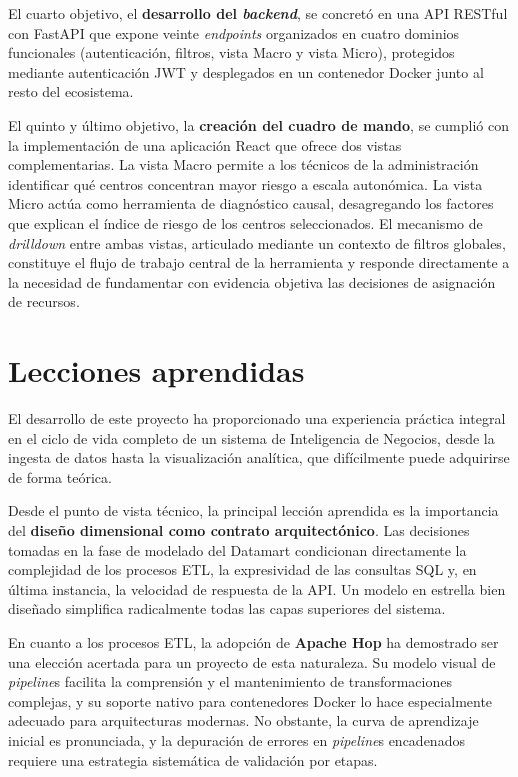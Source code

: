 El cuarto objetivo, el \textbf{desarrollo del \textit{backend}}, se concretó en una API RESTful con FastAPI que expone veinte \textit{endpoints} organizados en cuatro dominios funcionales (autenticación, filtros, vista Macro y vista Micro), protegidos mediante autenticación JWT y desplegados en un contenedor Docker junto al resto del ecosistema.

El quinto y último objetivo, la \textbf{creación del cuadro de mando}, se cumplió con la implementación de una aplicación React que ofrece dos vistas complementarias. La vista Macro permite a los técnicos de la administración identificar qué centros concentran mayor riesgo a escala autonómica. La vista Micro actúa como herramienta de diagnóstico causal, desagregando los factores que explican el índice de riesgo de los centros seleccionados. El mecanismo de \textit{drilldown} entre ambas vistas, articulado mediante un contexto de filtros globales, constituye el flujo de trabajo central de la herramienta y responde directamente a la necesidad de fundamentar con evidencia objetiva las decisiones de asignación de recursos.

\section{Lecciones aprendidas}

El desarrollo de este proyecto ha proporcionado una experiencia práctica integral en el ciclo de vida completo de un sistema de Inteligencia de Negocios, desde la ingesta de datos hasta la visualización analítica, que difícilmente puede adquirirse de forma teórica.

Desde el punto de vista técnico, la principal lección aprendida es la importancia del \textbf{diseño dimensional como contrato arquitectónico}. Las decisiones tomadas en la fase de modelado del Datamart condicionan directamente la complejidad de los procesos ETL, la expresividad de las consultas SQL y, en última instancia, la velocidad de respuesta de la API. Un modelo en estrella bien diseñado simplifica radicalmente todas las capas superiores del sistema.

En cuanto a los procesos ETL, la adopción de \textbf{Apache Hop} ha demostrado ser una elección acertada para un proyecto de esta naturaleza. Su modelo visual de \textit{pipeline}s facilita la comprensión y el mantenimiento de transformaciones complejas, y su soporte nativo para contenedores Docker lo hace especialmente adecuado para arquitecturas modernas. No obstante, la curva de aprendizaje inicial es pronunciada, y la depuración de errores en \textit{pipeline}s encadenados requiere una estrategia sistemática de validación por etapas.

